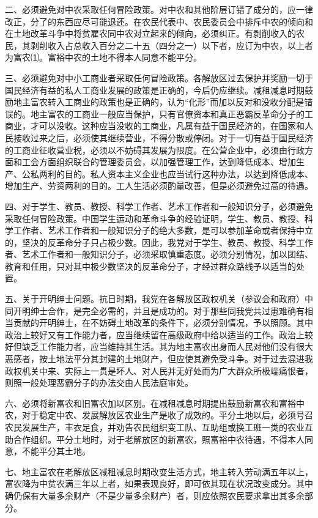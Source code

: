 \documentclass[UTF-8, a5paper, 12pt]{ctexart}
\begin{document}
二、必须避免对中农采取任何冒险政策。对中农和其他阶层订错了成分的，应一律改正，分了的东西应尽可能退还。在农民代表中、农民委员会中排斥中农的倾向和在土地改革斗争中将贫雇农同中农对立起来的倾向，必须纠正。有剥削收入的农民，其剥削收入占总收入百分之二十五（四分之一）以下者，应订为中农，以上者为富农⑴。富裕中农的土地不得本人同意不能平分。

三、必须避免对中小工商业者采取任何冒险政策。各解放区过去保护并奖励一切于国民经济有益的私人工商业发展的政策是正确的，今后仍应继续。减租减息时期鼓励地主富农转入工商业的政策也是正确的，认为“化形”而加以反对和没收分配是错误的。地主富农的工商业一般应当保护，只有官僚资本和真正恶霸反革命分子的工商业，才可以没收。这种应当没收的工商业，凡属有益于国民经济的，在国家和人民接收过来之后，必须使其继续营业，不得分散或停闭。对于一切有益于国民经济的工商业征收营业税，必须以不妨碍其发展为限度。在公营企业中，必须由行政方面和工会方面组织联合的管理委员会，以加强管理工作，达到降低成本、增加生产、公私两利的目的。私人资本主义企业也应当试行这种办法，以达到降低成本、增加生产、劳资两利的目的。工人生活必须酌量改善，但是必须避免过高的待遇。

四、对于学生、教员、教授、科学工作者、艺术工作者和一般知识分子，必须避免采取任何冒险政策。中国学生运动和革命斗争的经验证明，学生、教员、教授、科学工作者、艺术工作者和一般知识分子的绝大多数，是可以参加革命或者保持中立的，坚决的反革命分子只占极少数。因此，我党对于学生、教员、教授、科学工作者、艺术工作者和一般知识分子，必须采取慎重态度。必须分别情况，加以团结、教育和任用，只对其中极少数坚决的反革命分子，才经过群众路线予以适当的处置。

五、关于开明绅士问题。抗日时期，我党在各解放区政权机关（参议会和政府）中同开明绅士合作，是完全必需的，并且是成功的。对于那些同我党共过患难确有相当贡献的开明绅士，在不妨碍土地改革的条件下，必须分别情况，予以照顾。其中政治上较好又有工作能力者，应当继续留在高级政府中给以适当的工作。政治上较好但缺乏工作能力者，应当维持其生活。其为地主富农出身而人民对他们没有很大恶感者，按土地法平分其封建的土地财产，但应使其避免受斗争。对于过去混进我政权机关中来、实际上一贯是坏人、对人民并无好处而为广大群众所极端痛恨者，则照一般处理恶霸分子的办法交由人民法庭审处。

六、必须将新富农和旧富农加以区别。在减租减息时期提出鼓励新富农和富裕中农，对于稳定中农、发展解放区农业生产是收了成效的。平分土地以后，必须号召农民发展生产，丰衣足食，并劝告农民组织变工队、互助组或换工班一类的农业互助合作组织。平分土地时，对于老解放区的新富农，照富裕中农待遇，不得本人同意，不能平分其土地。

七、地主富农在老解放区减租减息时期改变生活方式，地主转入劳动满五年以上，富农降为中贫农满三年以上者，如果表现良好，即可依其现在状况改变成分。其中确仍保有大量多余财产（不是少量多余财产）者，则应依照农民要求拿出其多余部分。
\end{document}
